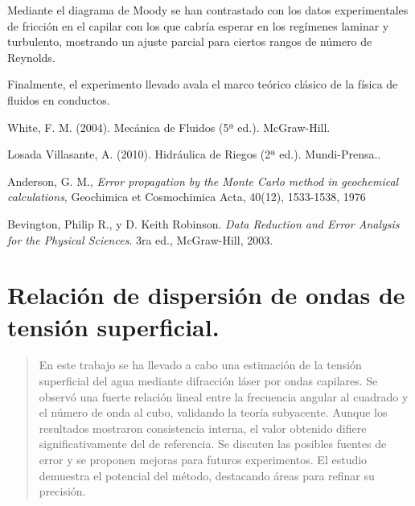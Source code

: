 	 \vspace{\baselineskip}
	 
	 Mediante el diagrama de Moody se han contrastado con los datos experimentales de fricción en el capilar con los que cabría esperar en los regímenes laminar y turbulento, mostrando un ajuste parcial para ciertos rangos de número de Reynolds.
	 
	 \vspace{\baselineskip}  
	
	 Finalmente, el experimento llevado avala el marco teórico clásico de la física de fluidos en conductos.
	 
	
	\begin{thebibliography}{99}
	
	 White, F. M. (2004). Mecánica de Fluidos (5ª ed.). McGraw-Hill.
	
	
	 Losada Villasante, A. (2010). Hidráulica de Riegos (2ª ed.). Mundi-Prensa..
	
	 Anderson, G. M., \textit{Error propagation by the Monte Carlo method in geochemical calculations}, Geochimica et Cosmochimica Acta, 40(12), 1533-1538, 1976

	 Bevington, Philip R., y D. Keith Robinson. \textit{Data Reduction and Error Analysis for the Physical Sciences}. 3ra ed., McGraw-Hill, 2003.
	
	
\end{thebibliography}


\clearpage
		

	
\titleformat{\chapter}[display]
{\normalfont\bfseries}{}{0pt}{\LARGE}
\chapter{Relación de dispersión de ondas de tensión superficial.}
\begin{abstract}
	\vspace{0.5cm}
	\footnotesize{En este trabajo se ha llevado a cabo una estimación  de la tensión superficial del agua mediante difracción láser por ondas capilares. Se observó una fuerte relación lineal entre la frecuencia angular al cuadrado y el número de onda al cubo, validando la teoría subyacente. Aunque los resultados mostraron consistencia interna, el valor obtenido difiere significativamente del de referencia. Se discuten las posibles fuentes de error y se proponen mejoras para futuros experimentos. El estudio demuestra el potencial del método, destacando áreas para refinar su precisión.}
	
\end{abstract}
